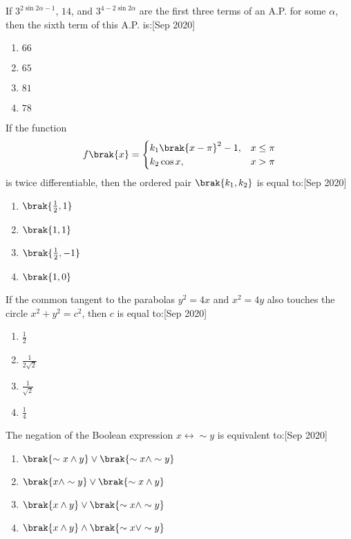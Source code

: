 \iffalse
    \title{5th September 2020 Shift 1}  
    \author{AI24BTECH11015}
    \section{mcq-single}
\fi
    \item If $3 ^ {2 \sin 2\alpha - 1}$, $14$, and $3 ^ {4 - 2 \sin 2\alpha}$ are the first three terms of an A.P. for some $\alpha$, then the sixth term of this A.P. is:\hfill{[Sep 2020]}
    \begin{enumerate}
        \item $66$
        \item $65$
        \item $81$
        \item $78$
    \end{enumerate}

    \item If the function 
    \begin{equation*}
    f\brak{x} = 
    \begin{cases}
    k_1 \brak{x-\pi}^2 -1, & x \leq \pi \\
    k_2 \cos x, & x > \pi
    \end{cases}
    \end{equation*}
    is twice differentiable, then the ordered pair $\brak{k_1, k_2}$ is equal to:\hfill{[Sep 2020]}
    \begin{enumerate}
        \item $\brak{\frac{1}{2}, 1}$
        \item $\brak{1, 1}$
        \item $\brak{\frac{1}{2}, -1}$
        \item $\brak{1, 0}$
    \end{enumerate}

    \item If the common tangent to the parabolas $y^2 = 4x$ and $x^2 = 4y$ also touches the circle $x^2 + y^2 = c^2$, then $c$ is equal to:\hfill{[Sep 2020]}
    \begin{enumerate}
        \item $\frac{1}{2}$
        \item $\frac{1}{2\sqrt{2}}$
        \item $\frac{1}{\sqrt{2}}$
        \item $\frac{1}{4}$
    \end{enumerate}

    \item The negation of the Boolean expression $x \leftrightarrow \sim y$ is equivalent to:\hfill{[Sep 2020]}
    \begin{enumerate}
        \item $\brak{\sim x \land y} \lor \brak{\sim x \land \sim y}$
        \item $\brak{x \land \sim y} \lor \brak{\sim x \land y}$
        \item $\brak{x \land y} \lor \brak{\sim x \land \sim y}$
        \item $\brak{x \land y} \land \brak{\sim x \lor \sim y}$
    \end{enumerate}

